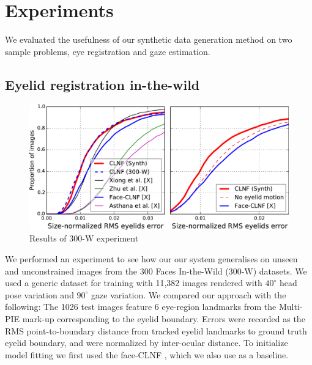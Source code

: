 
\section{Experiments}


% 

We evaluated the usefulness of our synthetic data generation method on two sample problems, eye registration and gaze estimation.


\subsection{Eyelid registration in-the-wild}

\begin{figure}
    \centering
    \includegraphics[width=\columnwidth]{figs/CLNF_300W_experiment.pdf}
    \caption{Results of 300-W experiment}
    \label{fig:clnf_results_wild}
\end{figure}



We performed an experiment to see how our our system generalises on unseen and unconstrained images from the 300 Faces In-the-Wild (300-W) \cite{sagonas2013300} datasets.
We used a generic \dataset dataset for training with 11,382 images rendered with $40^{\circ}$ head pose variation and $90^{\circ}$ gaze variation.
We compared our approach with the following: 
The 1026 test images feature 6 eye-region landmarks from the Multi-PIE \cite{gross2010multi} mark-up corresponding to the eyelid boundary. Errors were recorded as the RMS point-to-boundary distance from tracked eyelid landmarks to ground truth eyelid boundary, and were normalized by inter-ocular distance.
To initialize model fitting we first used the face-CLNF \cite{baltrusaitis2013constrained}, which we also use as a baseline.

